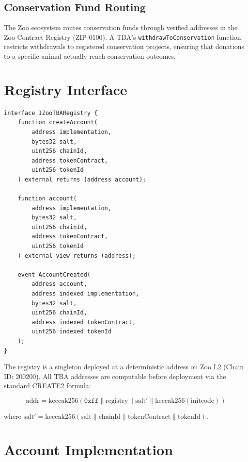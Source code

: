 \documentclass[11pt,letterpaper]{article}
\begin{document}
\subsection{Conservation Fund Routing}

The Zoo ecosystem routes conservation funds through verified addresses in the Zoo Contract Registry (ZIP-0100). A TBA's \texttt{withdrawToConservation} function restricts withdrawals to registered conservation projects, ensuring that donations to a specific animal actually reach conservation outcomes.

\section{Registry Interface}
\label{sec:interface}

\begin{lstlisting}[language=Solidity,caption=IZooTBARegistry interface]
interface IZooTBARegistry {
    function createAccount(
        address implementation,
        bytes32 salt,
        uint256 chainId,
        address tokenContract,
        uint256 tokenId
    ) external returns (address account);

    function account(
        address implementation,
        bytes32 salt,
        uint256 chainId,
        address tokenContract,
        uint256 tokenId
    ) external view returns (address);

    event AccountCreated(
        address account,
        address indexed implementation,
        bytes32 salt,
        uint256 chainId,
        address indexed tokenContract,
        uint256 indexed tokenId
    );
}
\end{lstlisting}

The registry is a singleton deployed at a deterministic address on Zoo L2 (Chain ID: 200200). All TBA addresses are computable before deployment via the standard CREATE2 formula:

\begin{equation}
\text{addr} = \text{keccak256}(\texttt{0xff} \| \text{registry} \| \text{salt}' \| \text{keccak256}(\text{initcode}))
\end{equation}

where $\text{salt}' = \text{keccak256}(\text{salt} \| \text{chainId} \| \text{tokenContract} \| \text{tokenId})$.

\section{Account Implementation}
\end{document}
